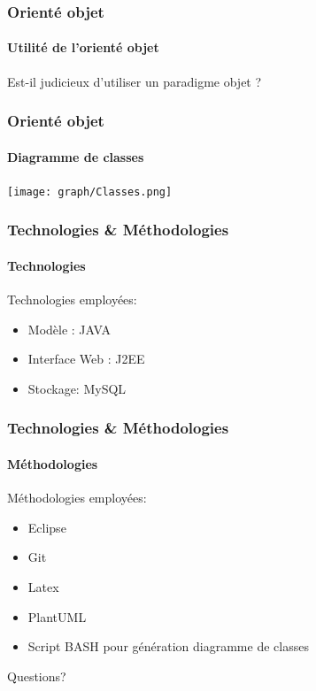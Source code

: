 \documentclass[aspectratio=169]{beamer}
\begin{document}
    \begin{frame}
        \frametitle{Orient\'e objet}
        \framesubtitle{Utilit\'e de l'orient\'e objet}
        Est-il judicieux d'utiliser un paradigme objet ?
    \end{frame}
    \begin{frame}
        \frametitle{Orient\'e objet}
        \framesubtitle{Diagramme de classes}
        \texttt{[image: graph/Classes.png]}
    \end{frame}

    \begin{frame}
        \frametitle{Technologies \& Méthodologies}
        \framesubtitle{Technologies}
        Technologies employées:
        \begin{itemize}
            \item Modèle : JAVA
            \item Interface Web : J2EE
            \item Stockage: MySQL
        \end{itemize}
    \end{frame}
    \begin{frame}
        \frametitle{Technologies \& Méthodologies}
        \framesubtitle{Méthodologies}
        Méthodologies employées:
        \begin{itemize}
            \item Eclipse
            \item Git
            \item Latex
            \item PlantUML
            \item Script BASH pour génération diagramme de classes
        \end{itemize}
    \end{frame}

    \begin{frame}
        \begin{center}
            Questions?
        \end{center}
    \end{frame}
\end{document}
